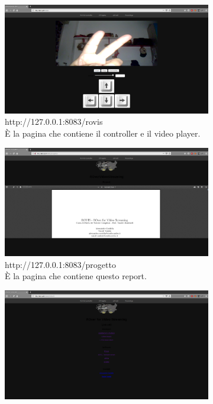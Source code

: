 \documentclass[11pt]{article}
\begin{document}
\begin{figure}[h!]
	\centering
	\begin{subfigure}[b]{0.4\textwidth}
		\includegraphics[width=\textwidth]{images/page-rovis.png}
		\caption{http://127.0.0.1:8083/rovis\\È la pagina che contiene il controller e il video player.}
		\label{fig:page-rovis}
	\end{subfigure}
	\begin{subfigure}[b]{0.4\textwidth}
		\includegraphics[width=\textwidth]{images/page-proj.png}
		\caption{http://127.0.0.1:8083/progetto\\È la pagina che contiene questo report.}
		\label{fig:page-project}
	\end{subfigure}
	\begin{subfigure}[b]{0.4\textwidth}
		\includegraphics[width=\textwidth]{images/page-link.png}

\end{subfigure}
\end{figure}
\end{document}

